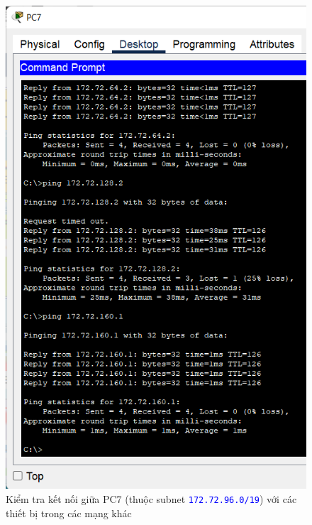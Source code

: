 \begin{enumerate}
\begin{enumerate}
\begin{figure}[H]
\begin{center}
\includegraphics[scale=.5]{../figures/p2/test-ping-8}
\end{center}
\caption{Kiểm tra kết nối giữa PC7 (thuộc subnet \texttt{\textcolor{blue}{172.72.96.0/19}}) với các thiết bị trong các mạng khác}
\end{figure}


\end{enumerate}
\end{enumerate}
